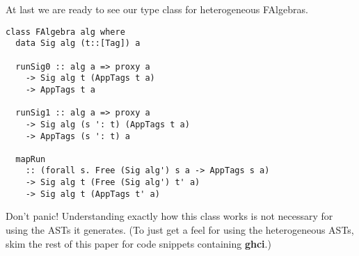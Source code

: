 \documentclass[preprint]{sigplanconf}
\theoremstyle{definition}
\begin{document}
At last we are ready to see our type class for heterogeneous FAlgebras.
\newpage
\begin{lstlisting}
class FAlgebra alg where
  data Sig alg (t::[Tag]) a

  runSig0 :: alg a => proxy a
    -> Sig alg t (AppTags t a)
    -> AppTags t a

  runSig1 :: alg a => proxy a
    -> Sig alg (s ': t) (AppTags t a)
    -> AppTags (s ': t) a

  mapRun
    :: (forall s. Free (Sig alg') s a -> AppTags s a)
    -> Sig alg t (Free (Sig alg') t' a)
    -> Sig alg t (AppTags t' a)
\end{lstlisting}
Don't panic!
Understanding exactly how this class works is not necessary for using the ASTs it generates.
(To just get a feel for using the heterogeneous ASTs,
skim the rest of this paper for code snippets containing \textbf{\footnotesize\ttfamily ghci}.)

\end{document}
